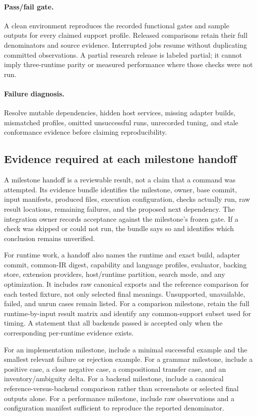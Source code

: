 \documentclass[11pt,a4paper]{article}
\begin{document}
\paragraph{Pass/fail gate.} A clean environment reproduces the recorded
functional gates and sample outputs for every claimed support profile.
Released comparisons retain their full denominators and source evidence.
Interrupted jobs resume without duplicating committed observations. A partial
research release is labeled partial; it cannot imply three-runtime parity or
measured performance where those checks were not run.

\paragraph{Failure diagnosis.} Resolve mutable dependencies, hidden host
services, missing adapter builds, mismatched profiles, omitted unsuccessful
runs, unrecorded tuning, and stale conformance evidence before claiming
reproducibility.

\subsection{Evidence required at each milestone handoff}

A milestone handoff is a reviewable result, not a claim that a command was attempted. Its evidence bundle identifies the milestone, owner, base commit, input manifests, produced files, execution configuration, checks actually run, raw result locations, remaining failures, and the proposed next dependency. The integration owner records acceptance against the milestone's frozen gate. If a check was skipped or could not run, the bundle says so and identifies which conclusion remains unverified.

For runtime work, a handoff also names the runtime and exact build, adapter
commit, common-IR digest, capability and language profiles, evaluator, backing
store, extension providers, host/runtime partition, search
mode, and any optimization. It includes raw canonical exports and the
reference comparison for each tested fixture, not only selected final
meanings. Unsupported, unavailable, failed, and unrun cases remain listed.
For a comparison milestone, retain the full runtime-by-input result matrix
and identify any common-support subset used for timing. A statement that all
backends passed is accepted only when the corresponding per-runtime evidence
exists.

For an implementation milestone, include a minimal successful example and the smallest relevant failure or rejection example. For a grammar milestone, include a positive case, a close negative case, a compositional transfer case, and an inventory/ambiguity delta. For a backend milestone, include a canonical reference-versus-backend comparison rather than screenshots or selected final outputs alone. For a performance milestone, include raw observations and a configuration manifest sufficient to reproduce the reported denominator.
\end{document}

